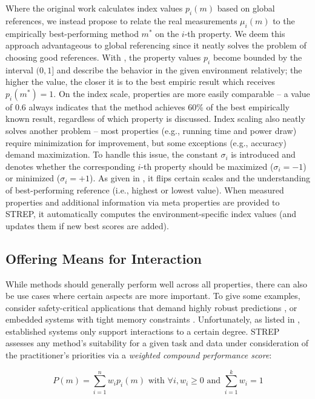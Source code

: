 \documentclass[sn-mathphys,Numbered]{sn-jnl}%
\theoremstyle{thmstylethree}%
\begin{document}
Where the original work calculates index values $p_i(m)$ based on global references, we instead propose to relate the real measurements $\mu_i(m)$ to the empirically best-performing method $m^\ast$ on the $i$-th property.
We deem this approach advantageous to global referencing since it neatly solves the problem of choosing good references.
With , the property values $p_{i}$ become bounded by the interval $(0, 1]$ and describe the behavior in the given environment relatively; the higher the value, the closer it is to the best empiric result which receives $p_i(m^*) = 1$.
On the index scale, properties are more easily comparable -- a value of $0.6$ always indicates that the method achieves 60\% of the best empirically known result, regardless of which property is discussed.
Index scaling also neatly solves another problem -- most properties (e.g., running time and power draw) require minimization for improvement, but some exceptions (e.g., accuracy) demand maximization.
To handle this issue, the constant $\sigma_i$ is introduced and denotes whether the corresponding $i$-th property should be maximized ($\sigma_i=-1$) or minimized ($\sigma_i=+1$).
As given in , it flips certain scales and the understanding of best-performing reference (i.e., highest or lowest value).
When measured properties and additional information via meta properties are provided to STREP, it automatically computes the environment-specific index values (and updates them if new best scores are added).

\subsection{Offering Means for Interaction}
\label{sec:meth:customization_via_weighting}
While methods should generally perform well across all properties, there can also be use cases where certain aspects are more important.
To give some examples, consider safety-critical applications that demand highly robust predictions \cite{croce2020robustbench}, or embedded systems with tight memory constraints \cite{buschjager2020site}.
Unfortunately, as listed in , established systems only support interactions to a certain degree.
STREP assesses any method's suitability for a given task and data under consideration of the practitioner's priorities via a \emph{weighted compound performance score}:

\begin{equation}\label{eq:compound}
P(m) = \sum_{i=1}^n w_i p_i(m) \textrm{ with } \forall i, w_i\geq0  \textrm{ and }  \sum_{i=1}^k w_i=1
\end{equation}
\end{document}
